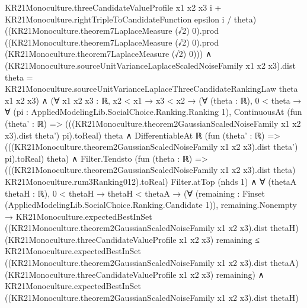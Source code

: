 \documentclass[10pt]{article}
\begin{document}
\begin{ReviewVerbatim}
                        KR21Monoculture.threeCandidateValueProfile x1 x2 x3 i +
                          KR21Monoculture.rightTripleToCandidateFunction epsilon i / theta)
                    ((KR21Monoculture.theorem7LaplaceMeasure (√2) 0).prod
                      ((KR21Monoculture.theorem7LaplaceMeasure (√2) 0).prod
                        (KR21Monoculture.theorem7LaplaceMeasure (√2) 0))) ∧
                (KR21Monoculture.sourceUnitVarianceLaplaceScaledNoiseFamily x1 x2 x3).dist theta =
                  KR21Monoculture.sourceUnitVarianceLaplaceThreeCandidateRankingLaw theta x1 x2 x3) ∧
        (∀ {x1 x2 x3 : ℝ},
            x2 < x1 →
              x3 < x2 →
                (∀ (theta : ℝ),
                    0 < theta →
                      ∀ (pi : AppliedModelingLib.SocialChoice.Ranking.Ranking 1),
                        ContinuousAt
                            (fun (theta' : ℝ) =>
                              (((KR21Monoculture.theorem2GaussianScaledNoiseFamily x1 x2 x3).dist theta') pi).toReal)
                            theta ∧
                          DifferentiableAt ℝ
                            (fun (theta' : ℝ) =>
                              (((KR21Monoculture.theorem2GaussianScaledNoiseFamily x1 x2 x3).dist theta') pi).toReal)
                            theta) ∧
                  Filter.Tendsto
                      (fun (theta : ℝ) =>
                        (((KR21Monoculture.theorem2GaussianScaledNoiseFamily x1 x2 x3).dist theta)
                            KR21Monoculture.rum3Ranking012).toReal)
                      Filter.atTop (nhds 1) ∧
                    ∀ (thetaA thetaH : ℝ),
                      0 < thetaH →
                        thetaH < thetaA →
                          (∀ (remaining : Finset (AppliedModelingLib.SocialChoice.Ranking.Candidate 1)),
                              remaining.Nonempty →
                                KR21Monoculture.expectedBestInSet
                                    ((KR21Monoculture.theorem2GaussianScaledNoiseFamily x1 x2 x3).dist thetaH)
                                    (KR21Monoculture.threeCandidateValueProfile x1 x2 x3) remaining ≤
                                  KR21Monoculture.expectedBestInSet
                                    ((KR21Monoculture.theorem2GaussianScaledNoiseFamily x1 x2 x3).dist thetaA)
                                    (KR21Monoculture.threeCandidateValueProfile x1 x2 x3) remaining) ∧
                            KR21Monoculture.expectedBestInSet
                                ((KR21Monoculture.theorem2GaussianScaledNoiseFamily x1 x2 x3).dist thetaH)

\end{ReviewVerbatim}
\end{document}
